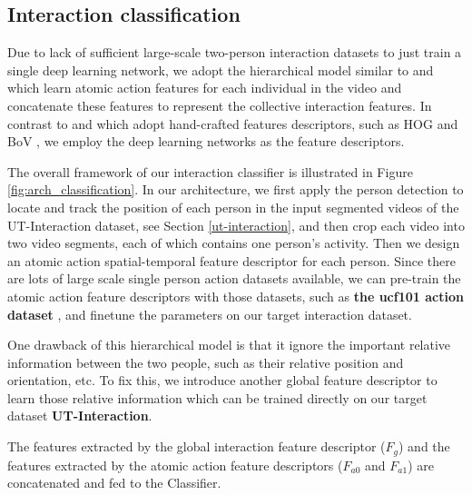 \subsection{Interaction classification} 
\label{arch_classification}
Due to lack of sufficient large-scale two-person interaction datasets to just train a single deep learning network, we adopt the hierarchical model similar to \cite{choi2012} and  \cite{patron2010} which learn atomic action features for each individual in the video and concatenate these features to represent the collective interaction features. In contrast to  \cite{choi2012} and \cite{patron2010} which adopt hand-crafted features descriptors, such as HOG \cite{hog} and BoV \cite{bov}, we employ the deep learning networks as the feature descriptors.
\par    
The overall framework of our interaction classifier is illustrated in Figure \ref{fig:arch_classification}. In our architecture, we first apply the person detection to locate and track the position of each person in the input segmented videos of the UT-Interaction dataset, see Section \ref{ut-interaction}, and then crop each video into two video segments, each of which contains one person's activity. Then we design an atomic action spatial-temporal feature descriptor for each person. Since there are lots of large scale single person action datasets available, we can pre-train the atomic action feature descriptors with those datasets, such as \textbf{the ucf101 action dataset} \cite{ucf101}, and finetune the parameters on our target interaction dataset.
\par 
One drawback of this hierarchical model is that it ignore the important relative information between the two people, such as their relative position and orientation, etc. To fix this, we introduce another global feature descriptor to learn those relative information which can be trained directly on our target dataset \textbf{UT-Interaction}. 
\par 
The features extracted by the global interaction feature descriptor (\(F_g\)) and the features extracted by the atomic action feature descriptors (\(F_{a0}\) and \(F_{a1}\)) are concatenated and fed to the Classifier.  
 
